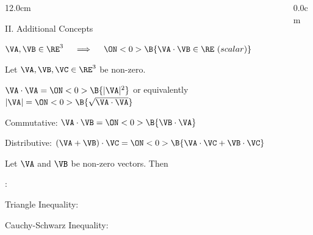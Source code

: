 \begin{frame}
\begin{columns}
\begin{column}{12.0cm}

{II. Additional Concepts}

\vspace{0.2cm}

\scriptsize

\NOTE

\vspace{0.1cm}

\OBUL $\VA,\VB \in \RE^3 \quad \implies \quad \ON<0>{\B{\VA \cdot \VB \in \RE \,\, (scalar)}}$ \\

\vspace{0.7cm}

\PROP Let $\VA, \VB, \VC \in \RE^3$ be non-zero.

\vspace{0.2cm}

\OBUL $\VA \cdot \VA = \ON<0>{\B{|\VA|^2}}$ \quad or equivalently \quad $|\VA| = \ON<0>{\B{\sqrt{\VA \cdot \VA}}}$

\vspace{0.2cm}

\OBUL Commutative: $\VA \cdot \VB = \ON<0>{\B{\VB \cdot \VA}}$

\vspace{0.2cm}

\OBUL Distributive: $(\VA + \VB) \cdot \VC = \ON<0>{\B{\VA \cdot \VC + \VB \cdot \VC}}$

\vspace{0.7cm}

\THM Let $\VA$ and $\VB$ be non-zero vectors.  Then
\begin{center}
\end{center}

\vspace{0.2cm}

:	

\vspace{0.2cm}

\OBUL Triangle Inequality: \quad {}

\vspace{0.2cm}

\OBUL Cauchy-Schwarz Inequality: \quad {}

\vspace{0.7cm}

\end{column}
\begin{column}{0.0cm}\end{column}
\end{columns}
\end{frame}

